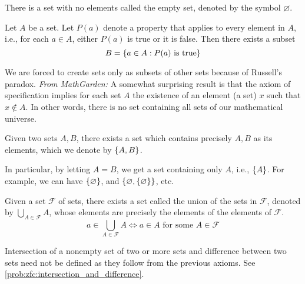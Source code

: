 \begin{axiom} \label{zfc:existence}
    There is a set with no elements called the empty set, denoted by the symbol $\varnothing$.
\end{axiom}

\begin{axiom} \label{zfc:specification}
    Let $A$ be a set. Let $P(a)$ denote a property that applies to every element in $A$, i.e., for each $a \in A$, either $P(a)$ is true or it is false. Then there exists a subset
    \[
        B = \set{a \in A: P(a) \text{ is true}}
    \]
\end{axiom}
\begin{rem}
    We are forced to create sets only as subsets of other sets because of Russell's paradox. \textcolor{red!85!black}{\emph{From MathGarden:} A somewhat surprising result is that the axiom of specification implies for each set $A$ the existence of an element (a set) $x$ such that $x \not\in A$. In other words, there is no set containing all sets of our mathematical universe.}
\end{rem}

\begin{axiom}\label{zfc:pairing}
    Given two sets $A, B$, there exists a set which contains precisely $A, B$ as its elements, which we denote by $\set{A, B}$.
\end{axiom}
\begin{rem}
    In particular, by letting $A = B$, we get a set containing only $A$, i.e., $\set{A}$. For example, we can have $\set{\varnothing}$, and $\set{\varnothing, \set{\varnothing}}$, etc.
\end{rem}

\begin{axiom} \label{zfc:unions}
    Given a set $\mathscr{F}$ of sets, there exists a set called the union of the sets in $\mathscr{F}$, denoted by $\bigcup_{A \in \mathscr{F}} A$, whose elements are precisely the elements of the elements of $\mathscr{F}$.
    \[
        a \in \bigcup_{A \in \mathscr{F}} A \iff a \in A \text{ for some } A \in \mathscr{F}
    \]
\end{axiom}

\begin{rem}
    Intersection of a nonempty set of two or more sets and difference between two sets need not be defined as they follow from the previous axioms.
    See \cref{prob:zfc:intersection_and_difference}.
\end{rem}

